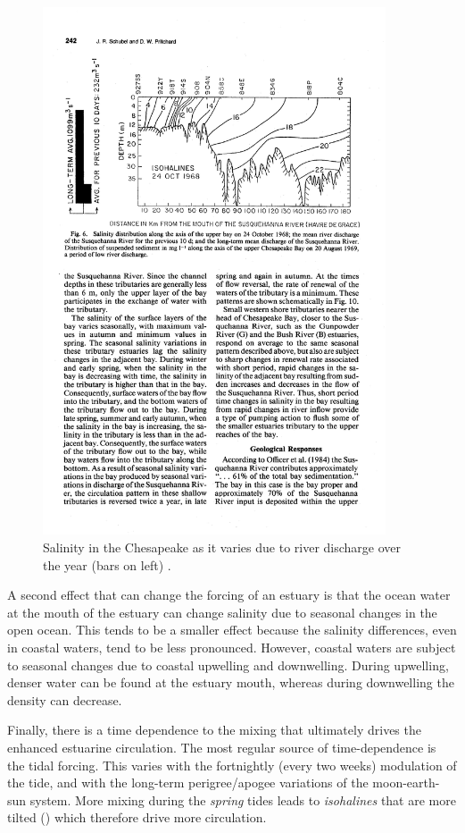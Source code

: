 \begin{figure}[htb]
  \includegraphics[width=4in]{figs/SchubelPritchard86Fig6}
  \caption{Salinity in the Chesapeake as it varies due to river
    discharge over the year (bars on left) \citep{schubelpritchard86}.}
  \label{fig:SchubelPritchard86}
\end{figure}

A second effect that can change the forcing of an estuary is that  the ocean water at the mouth of the estuary can change salinity due to seasonal changes in the open ocean.  This tends to be a smaller effect because the salinity differences, even in coastal waters, tend to be less pronounced.  However, coastal waters are subject to seasonal changes due to coastal upwelling and downwelling.  During upwelling, denser water can be found at the estuary mouth, whereas during downwelling the density can decrease.

Finally, there is a time dependence to the mixing that ultimately drives the enhanced estuarine circulation.  The most regular source of time-dependence is the tidal forcing. This varies with the fortnightly (every two weeks) modulation of the tide, and with the long-term perigree/apogee variations of the moon-earth-sun system.  More mixing during the \emph{spring} tides leads to \emph{isohalines} that are more tilted () which therefore drive more circulation.

